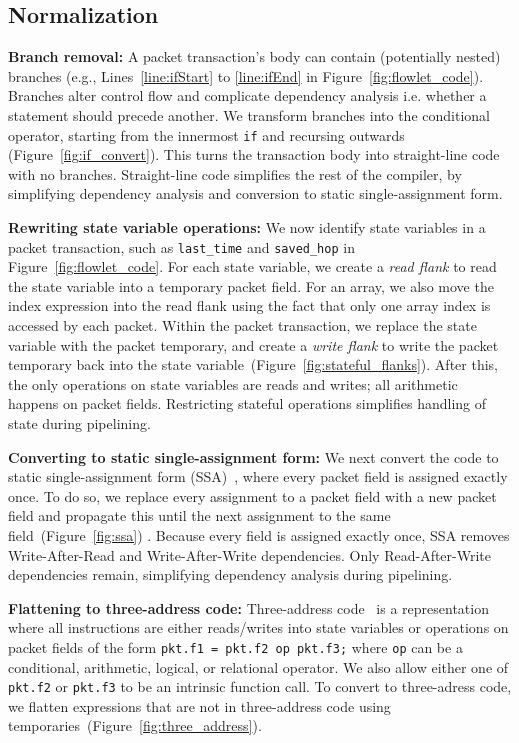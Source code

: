 \subsection{Normalization}
\label{ss:normalization}

\textbf{Branch removal: }A packet transaction's body can contain (potentially
nested) branches (e.g., Lines~\ref{line:ifStart} to \ref{line:ifEnd} in
Figure~\ref{fig:flowlet_code}).  Branches alter control flow and complicate
dependency analysis i.e.  whether a statement should precede another.  We
transform branches into the conditional operator, starting from the innermost
\texttt{if} and recursing outwards (Figure~\ref{fig:if_convert}).  This turns
the transaction body into straight-line code with no branches.  Straight-line
code simplifies the rest of the compiler, by simplifying dependency analysis
and conversion to static single-assignment form.

\textbf{Rewriting state variable operations: }We now identify state variables
in a packet transaction, such as \texttt{last\_time} and \texttt{saved\_hop} in
Figure~\ref{fig:flowlet_code}.  For each state variable, we create a
\textit{read flank} to read the state variable into a temporary packet field.
For an array, we also move the index expression into the read flank using the
fact that only one array index is accessed by each packet.  Within the packet
transaction, we replace the state variable with the packet temporary, and
create a \textit{write flank} to write the packet temporary back into the state
variable~(Figure~\ref{fig:stateful_flanks}). After this, the only operations
on state variables are reads and writes; all arithmetic happens on packet
fields. Restricting stateful operations simplifies handling of state during
pipelining.

\textbf{Converting to static single-assignment form: }We next convert the code to
static single-assignment form (SSA)~\cite{ssa}, where every packet field is
assigned exactly once. To do so, we replace every assignment to a packet field
with a new packet field and propagate this until the next assignment to the
same field~(Figure~\ref{fig:ssa}) .  Because every field is assigned exactly
once, SSA removes Write-After-Read and Write-After-Write dependencies.  Only
Read-After-Write dependencies remain, simplifying dependency analysis during
pipelining.

\textbf{Flattening to three-address code: } Three-address code~\cite{tac} is a
representation where all instructions are either reads/writes into state
variables or operations on packet fields of the form \texttt{pkt.f1 = pkt.f2 op
pkt.f3;} where \texttt{op} can be a conditional, arithmetic, logical, or
relational operator.  We also allow either one of {\tt pkt.f2} or {\tt pkt.f3}
to be an intrinsic function call.  To convert to three-adress code, we flatten
expressions that are not in three-address code using
temporaries~(Figure~\ref{fig:three_address}).

